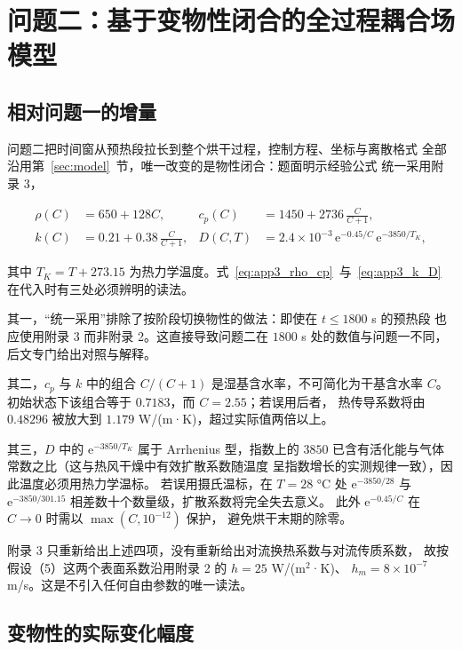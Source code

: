\section{问题二：基于变物性闭合的全过程耦合场模型}
\label{sec:p2}

\subsection{相对问题一的增量}

问题二把时间窗从预热段拉长到整个烘干过程，控制方程、坐标与离散格式
全部沿用第~\ref{sec:model}~节，唯一改变的是物性闭合：题面明示经验公式
统一采用附录 3，

\begin{align}
\rho(C)&=650+128C, &
c_p(C)&=1450+2736\,\frac{C}{C+1},
\label{eq:app3_rho_cp}\\
k(C)&=0.21+0.38\,\frac{C}{C+1}, &
D(C,T)&=2.4\times10^{-3}\,\mathrm{e}^{-0.45/C}\,\mathrm{e}^{-3850/T_K},
\label{eq:app3_k_D}
\end{align}

其中 $T_K=T+273.15$ 为热力学温度。式~\eqref{eq:app3_rho_cp}~与~\eqref{eq:app3_k_D}~
在代入时有三处必须辨明的读法。

其一，“统一采用”排除了按阶段切换物性的做法：即使在 $t\le1800$ s 的预热段
也应使用附录 3 而非附录 2。这直接导致问题二在 $1800$ s 处的数值与问题一不同，
后文专门给出对照与解释。

其二，$c_p$ 与 $k$ 中的组合 $C/(C+1)$ 是湿基含水率，不可简化为干基含水率 $C$。
初始状态下该组合等于 $0.7183$，而 $C=2.55$；若误用后者，
热传导系数将由 $0.48296$ 被放大到 $1.179$ W/(m·K)，超过实际值两倍以上。

其三，$D$ 中的 $\mathrm{e}^{-3850/T_K}$ 属于 Arrhenius 型，指数上的 $3850$
已含有活化能与气体常数之比（这与热风干燥中有效扩散系数随温度
呈指数增长的实测规律一致），因此温度必须用热力学温标。
若误用摄氏温标，在 $T=28$ °C 处 $\mathrm{e}^{-3850/28}$ 与
$\mathrm{e}^{-3850/301.15}$ 相差数十个数量级，扩散系数将完全失去意义。
此外 $\mathrm{e}^{-0.45/C}$ 在 $C\to0$ 时需以 $\max(C,10^{-12})$ 保护，
避免烘干末期的除零。

附录 3 只重新给出上述四项，没有重新给出对流换热系数与对流传质系数，
故按假设（5）这两个表面系数沿用附录 2 的 $h=25$ W/(m$^2$·K)、
$h_m=8\times10^{-7}$ m/s。这是不引入任何自由参数的唯一读法。

\subsection{变物性的实际变化幅度}

